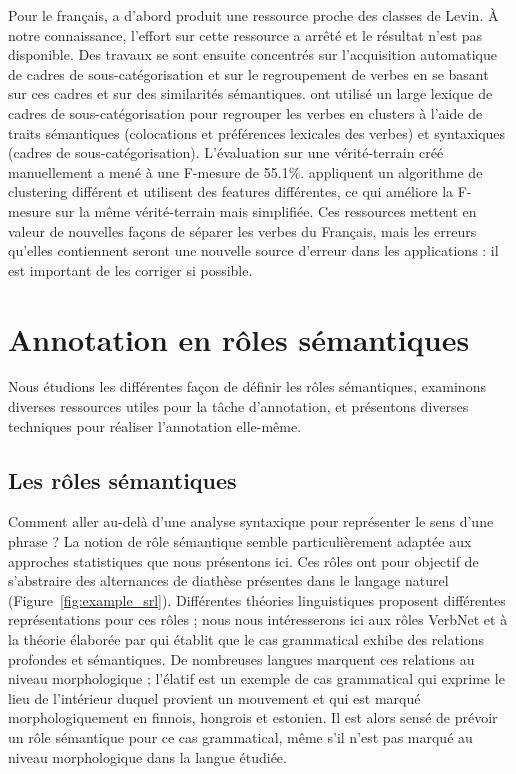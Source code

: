 Pour le français, \cite{saintdizier1996constructing} a d'abord produit une
ressource proche des classes de Levin. À notre connaissance, l'effort sur cette
ressource a arrêté et le résultat n'est pas disponible. Des travaux se sont
ensuite concentrés sur l'acquisition automatique de cadres de
sous-catégorisation et sur le regroupement de verbes en se basant sur ces
cadres et sur des similarités sémantiques. \cite{sun2010investigating} ont
utilisé un large lexique de cadres de sous-catégorisation
\citep{messiant2010acquisition} pour regrouper les verbes en clusters à l'aide
de traits sémantiques (colocations et préférences lexicales des verbes) et
syntaxiques (cadres de sous-catégorisation). L'évaluation sur une
vérité-terrain créé manuellement a mené à une F-mesure de 55.1\%.
\cite{falk2012classifying} appliquent un algorithme de clustering différent et
utilisent des features différentes, ce qui améliore la F-mesure sur la même
vérité-terrain mais simplifiée. Ces ressources mettent en valeur de nouvelles
façons de séparer les verbes du Français, mais les erreurs qu'elles contiennent
seront une nouvelle source d'erreur dans les applications : il est important de
les corriger si possible.


\section{Annotation en rôles sémantiques}
\label{sec:srl}

Nous étudions les différentes façon de définir les rôles sémantiques, examinons
diverses ressources utiles pour la tâche d'annotation, et présentons diverses
techniques pour réaliser l'annotation elle-même.

\subsection{Les rôles sémantiques}
\label{subsec:roles_semantiques}

Comment aller au-delà d'une analyse syntaxique pour représenter le sens d'une
phrase ? La notion de rôle sémantique semble particulièrement adaptée aux
approches statistiques que nous présentons ici. Ces rôles ont pour objectif de
s'abstraire des alternances de diathèse présentes dans le langage naturel
(Figure~\ref{fig:example_srl}). Différentes théories linguistiques proposent
différentes représentations pour ces rôles ; nous nous intéresserons ici aux
rôles VerbNet et à la théorie élaborée par \cite{fillmore1968case} qui établit
que le cas grammatical exhibe des relations profondes et sémantiques. De
nombreuses langues marquent ces relations au niveau morphologique ; l'élatif
est un exemple de cas grammatical qui exprime le lieu de l'intérieur duquel
provient un mouvement et qui est marqué morphologiquement en finnois, hongrois
et estonien. Il est alors sensé de prévoir un rôle sémantique pour ce cas
grammatical, même s'il n'est pas marqué au niveau morphologique dans la langue
étudiée.

